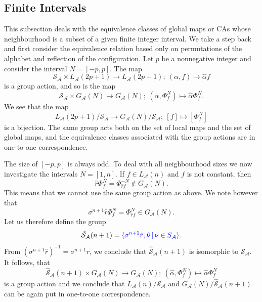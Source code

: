 \documentclass[11pt,a4paper]{article}
\newcommand{\rev}[1]{{\color{blue}#1}}
\newcommand{\rev}[1]{{\color{black}#1}}
\begin{document}
\subsection{Finite Intervals}

This subsection deals with the equivalence classes of global maps or CAs whose neighbourhood
is a subset of a given finite integer interval.
We take a step back and first consider the equivalence relation based only on
permutations of the alphabet and reflection of the configuration.
Let $p$ be a nonnegative integer and consider the interval $N=[-p,p]$.
The map
\[
\mathcal{S}_\mathcal{A}  \times L_\mathcal{A}(2p+1) \to L_\mathcal{A}(2p+1); \
(\alpha, f) \mapsto \hat{\alpha}f
\]
is a group action, and so
is the map
\[
\mathcal{S}_\mathcal{A} \times G_\mathcal{A}(N) \to G_\mathcal{A}(N); \
(\alpha, \Phi^N_f) \mapsto \hat{\alpha} \Phi^N_f.
\]
We see that the map
\[
L_\mathcal{A}(2p+1) / \mathcal{S}_\mathcal{A} \to G_\mathcal{A}(N)/\mathcal{S}_\mathcal{A}; \
[f] \mapsto [\Phi^N_f]
\]
 is a bijection.
The same group acts both on the set of local maps and the set of global maps,
and the equivalence classes associated with the group actions are in one-to-one correspondence.

The size of $[-p,p]$ is always odd.
To deal with all neighbourhood sizes we now investigate the intervals $N = [1,n]$.
If $f \in L_\mathcal{A}(n)$ and $f$ is not constant, then
\[
\hat{r}\Phi^{N}_f = \Phi^{-N}_{\hat{r}f} \not \in G_\mathcal{A}(N).
\]
This means that we cannot use the same group action as above.
We note however that
\[
\sigma^{n+1}\hat{r}\Phi^N_f = \Phi^{N}_{\hat{r}f} \in G_\mathcal{A}(N).
\]
Let us therefore define the group
\[
\hat{\mathcal{S}}_\mathcal{A}(n+1) = \rev{\langle \sigma^{n+1}\hat{r}, \hat{\nu} \, | \, \nu \in S_\mathcal{A} \rangle}.
\]
From $(\sigma^{n+1}\hat{r})^{-1} = \sigma^{n+1}\hat{r}$, we conclude that
$\hat{\mathcal{S}}_\mathcal{A}(n+1)$ is isomorphic to $\mathcal{S}_\mathcal{A}$.
It follows, that
\[
\hat{\mathcal{S}}_\mathcal{A}(n+1) \times G_\mathcal{A}(N) \to G_\mathcal{A}(N); \
(\hat{\alpha}, \Phi^N_f) \mapsto \hat{\alpha} \Phi^N_f
\]
is a group action and we conclude that
$L_\mathcal{A}(n) / \mathcal{S}_\mathcal{A}$
and $G_\mathcal{A}(N)/\hat{\mathcal{S}}_\mathcal{A}(n+1)$ can be again put in one-to-one correspondence.
\end{document}
